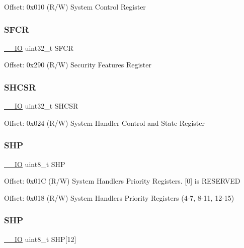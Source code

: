 Offset\+: 0x010 (R/W) System Control Register \mbox{\label{struct_s_c_b___type_aa71bce1c6b3b85a1625a4bf040db7234}} 
\subsubsection{\texorpdfstring{SFCR}{SFCR}}
{\footnotesize\ttfamily \mbox{\hyperlink{core__sc300_8h_aec43007d9998a0a0e01faede4133d6be}{\+\_\+\+\_\+\+IO}} uint32\+\_\+t S\+F\+CR}

Offset\+: 0x290 (R/W) Security Features Register \mbox{\label{struct_s_c_b___type_a04d136e5436e5fa2fb2aaa78a5f86b19}} 
\subsubsection{\texorpdfstring{SHCSR}{SHCSR}}
{\footnotesize\ttfamily \mbox{\hyperlink{core__sc300_8h_aec43007d9998a0a0e01faede4133d6be}{\+\_\+\+\_\+\+IO}} uint32\+\_\+t S\+H\+C\+SR}

Offset\+: 0x024 (R/W) System Handler Control and State Register \mbox{\label{struct_s_c_b___type_af6c413ed8c7d1b792a91f01e13b47adf}} 
\subsubsection{\texorpdfstring{SHP}{SHP}\hspace{0.1cm}{\footnotesize\ttfamily [1/2]}}
{\footnotesize\ttfamily \mbox{\hyperlink{core__sc300_8h_aec43007d9998a0a0e01faede4133d6be}{\+\_\+\+\_\+\+IO}} uint8\+\_\+t S\+HP}

Offset\+: 0x01C (R/W) System Handlers Priority Registers. \mbox{[}0\mbox{]} is R\+E\+S\+E\+R\+V\+ED

Offset\+: 0x018 (R/W) System Handlers Priority Registers (4-\/7, 8-\/11, 12-\/15) \mbox{\label{struct_s_c_b___type_a17dc9f83c53cbf7fa249e79a2d2a43f8}} 
\subsubsection{\texorpdfstring{SHP}{SHP}\hspace{0.1cm}{\footnotesize\ttfamily [2/2]}}
{\footnotesize\ttfamily \mbox{\hyperlink{core__sc300_8h_aec43007d9998a0a0e01faede4133d6be}{\+\_\+\+\_\+\+IO}} uint8\+\_\+t S\+HP\mbox{[}12\mbox{]}}

